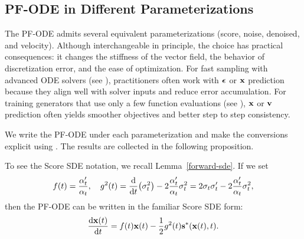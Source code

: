\subsection{PF-ODE in Different Parameterizations}\label{subsec:pf-ode-different-para} 
The PF-ODE admits several equivalent parameterizations (score, noise, denoised, and velocity). 
Although interchangeable in principle, the choice has practical consequences: it changes the stiffness of the vector field, the behavior of discretization error, and the ease of optimization.
For fast sampling with advanced ODE solvers (see ), practitioners often work with ${\bm{\epsilon}}$ or ${\mathbf{x}}$ prediction because they align well with solver inputs and reduce error accumulation.
For training generators that use only a few function evaluations (see ), ${\mathbf{x}}$ or ${\mathbf{v}}$ prediction often yields smoother objectives and better step to step consistency.


We write the PF-ODE under each parameterization and make
the conversions explicit using . The
results are collected in the following proposition.

To see the Score SDE notation, we recall Lemma~\ref{forward-sde}.  If we set
\[
f(t) = \frac{\alpha_t'}{\alpha_t}, 
\quad
g^2(t) = \frac{\mathop{}\!\mathrm{d}}{\mathop{}\!\mathrm{d} t} \big(\sigma_t^2\big) 
         - 2 \frac{\alpha_t'}{\alpha_t} \sigma_t^2
       = 2\sigma_t\sigma_t' - 2 \frac{\alpha_t'}{\alpha_t} \sigma_t^2,
\]
then the PF-ODE can be written in the familiar Score SDE form:
\[
\frac{\mathop{}\!\mathrm{d} {\mathbf{x}}(t)}{\mathop{}\!\mathrm{d} t}
= f(t) {\mathbf{x}}(t)  -  \frac{1}{2} g^2(t) {\mathbf{s}}^*({\mathbf{x}}(t),t).
\]

